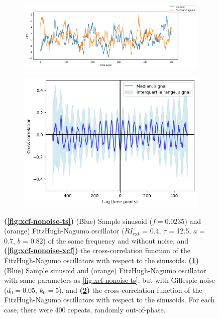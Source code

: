 \begin{figure}
  \begin{subfigure}[t]{0.6\textwidth}
  \centering
    \includegraphics[width=\linewidth]{sinusoid_and_fitzhughnagumo_gillnoise.png}
    \caption{
    }
    \label{fig:xcf-gillnoise-ts}
  \end{subfigure}%
  \centering
  \begin{subfigure}[t]{0.4\textwidth}
  \centering
    \includegraphics[width=\linewidth]{randomshift_sinusoid_fitzhughnagumo_gillnoise_xcf.png}
    \caption{
    }
    \label{fig:xcf-gillnoise-xcf}
  \end{subfigure}

  \caption{
    \textbf{(\ref{fig:xcf-nonoise-ts})}
    (Blue) Sample sinusoid ($f = 0.0235$) and (orange) FitzHugh-Nagumo oscillator ($RI_{\mathrm{ext}}$ = 0.4, $\tau$ = 12.5, $a$ = 0.7, $b$ = 0.82) of the same frequency and without noise, and
    \textbf{(\ref{fig:xcf-nonoise-xcf})}
    the cross-correlation function of the FitzHugh-Nagumo oscillators with respect to the sinusoids.
    \textbf{(\ref{fig:xcf-gillnoise-ts})}
    (Blue) Sample sinusoid and (orange) FitzHugh-Nagumo oscillator with same parameters as \ref{fig:xcf-nonoise-ts}, but with Gillespie noise ($d_{0} = 0.05$, $k_{0} = 5$), and
    \textbf{(\ref{fig:xcf-gillnoise-xcf})}
    the cross-correlation function of the FitzHugh-Nagumo oscillators with respect to the sinusoids.
    For each case, there were 400 repeats, randomly out-of-phase.
  }
  \label{fig:xcf}
\end{figure}

